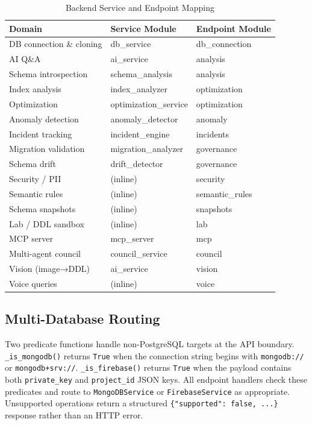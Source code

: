\documentclass[conference]{IEEEtran}
\begin{document}
\begin{table}[htbp]
\caption{Backend Service and Endpoint Mapping}
\label{tab:services}
\begin{tabular}{>{\raggedright}p{2.8cm} >{\raggedright}p{2.3cm} >{\raggedright\arraybackslash}p{2.3cm}}
\toprule
\textbf{Domain} & \textbf{Service Module} & \textbf{Endpoint Module} \\
\midrule
DB connection \& cloning & db\_service & db\_connection \\
AI Q\&A & ai\_service & analysis \\
Schema introspection & schema\_analysis & analysis \\
Index analysis & index\_analyzer & optimization \\
Optimization & optimization\_service & optimization \\
Anomaly detection & anomaly\_detector & anomaly \\
Incident tracking & incident\_engine & incidents \\
Migration validation & migration\_analyzer & governance \\
Schema drift & drift\_detector & governance \\
Security / PII & (inline) & security \\
Semantic rules & (inline) & semantic\_rules \\
Schema snapshots & (inline) & snapshots \\
Lab / DDL sandbox & (inline) & lab \\
MCP server & mcp\_server & mcp \\
Multi-agent council & council\_service & council \\
Vision (image→DDL) & ai\_service & vision \\
Voice queries & (inline) & voice \\
\bottomrule
\end{tabular}
\end{table}

\subsection{Multi-Database Routing}

Two predicate functions handle non-PostgreSQL targets at the API boundary.
\texttt{\_is\_mongodb()} returns \texttt{True} when the connection string
begins with \texttt{mongodb://} or \texttt{mongodb+srv://}.
\texttt{\_is\_firebase()} returns \texttt{True} when the payload contains
both \texttt{private\_key} and \texttt{project\_id} JSON keys. All endpoint
handlers check these predicates and route to \texttt{MongoDBService} or
\texttt{FirebaseService} as appropriate. Unsupported operations return a
structured \texttt{\{"supported": false, ...\}} response rather than an
HTTP error.
\end{document}
